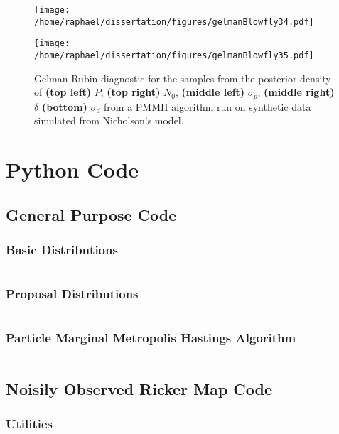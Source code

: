 \documentclass[12pt]{article}
\begin{document}
\begin{appendices}
\begin{figure}[htb]
\begin{minipage}{0.49\textwidth}
			\centering
			\texttt{[image: /home/raphael/dissertation/figures/gelmanBlowfly34.pdf]}
		\end{minipage}
		\begin{minipage}{0.49\textwidth}
			\centering
			\texttt{[image: /home/raphael/dissertation/figures/gelmanBlowfly35.pdf]}
		\end{minipage}
		\caption[Gelman-Rubin diagnostic of the chains of a PMMH algorithm run on on synthetic data, Nicholson's model]{Gelman-Rubin diagnostic for the samples from the posterior density of \textbf{(top left)} $P$, \textbf{(top right)} $N_0$,  \textbf{(middle left)} $\sigma_p$,  \textbf{(middle right)} $\delta$ \textbf{(bottom)} $\sigma_d$ from a PMMH algorithm run on synthetic data simulated from Nicholson's model.}
		\label{fig:gelmanBlowfly}
	\end{figure}
	\clearpage
	\section{Python Code}
	\subsection{General Purpose Code}
	\subsubsection{Basic Distributions}
	\inputminted[fontsize=\small, linenos, frame=lines,
	framesep=2mm, baselinestretch=1]{cython}{/home/raphael/dissertation/distributions/distributions2.pyx}
	\clearpage
	\subsubsection{Proposal Distributions}
	\inputminted[fontsize=\small, linenos, frame=lines,
	framesep=2mm, baselinestretch=1]{python}{/home/raphael/dissertation/proposals/proposals.py}
	\clearpage
	\subsubsection{Particle Marginal Metropolis Hastings Algorithm}
	\inputminted[fontsize=\small, linenos, frame=lines,
	framesep=2mm, baselinestretch=1]{python}{/home/raphael/dissertation/pmcmc/pmmh.py}
	\clearpage
	\subsection{Noisily Observed Ricker Map Code}
	\subsubsection{Utilities}
	\inputminted[fontsize=\small, linenos, frame=lines,
	framesep=2mm, baselinestretch=1]{cython}{/home/raphael/dissertation/bootstrap/utils_ricker.pyx}
	\clearpage

\end{appendices}
\end{document}
